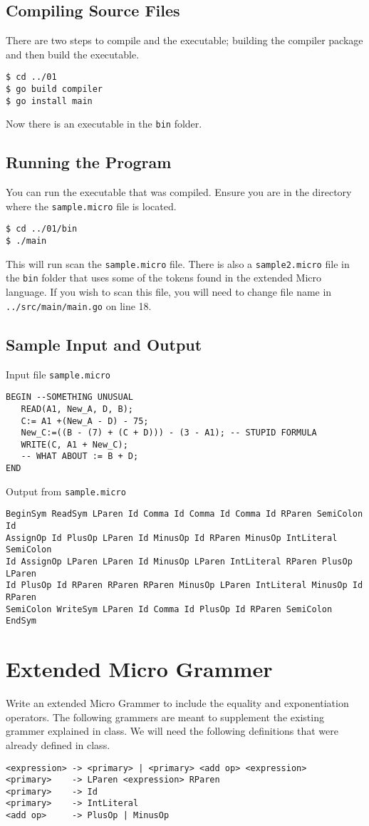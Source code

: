 \documentclass[11pt]{article}
\begin{document}
\subsection{Compiling Source Files}
\label{sec-1-3}
There are two steps to compile and the executable; building the compiler
package and then build the executable.
\begin{verbatim}
$ cd ../01
$ go build compiler
$ go install main
\end{verbatim}
Now there is an executable in the \texttt{bin} folder.

\subsection{Running the Program}
\label{sec-1-4}
You can run the executable that was compiled. Ensure you are in the 
directory where the \texttt{sample.micro} file is located.
\begin{verbatim}
$ cd ../01/bin
$ ./main
\end{verbatim}

This will run scan the \texttt{sample.micro} file. There is also a \texttt{sample2.micro}
file in the \texttt{bin} folder that uses some of the tokens found in the 
extended Micro language. If you wish to scan this file, you will need to
change file name in \texttt{../src/main/main.go} on line 18.

\subsection{Sample Input and Output}
\label{sec-1-5}
Input file \texttt{sample.micro}
\begin{verbatim}
BEGIN --SOMETHING UNUSUAL
   READ(A1, New_A, D, B);
   C:= A1 +(New_A - D) - 75;
   New_C:=((B - (7) + (C + D))) - (3 - A1); -- STUPID FORMULA
   WRITE(C, A1 + New_C);
   -- WHAT ABOUT := B + D;
END
\end{verbatim}
Output from \texttt{sample.micro}
\begin{verbatim}
BeginSym ReadSym LParen Id Comma Id Comma Id Comma Id RParen SemiColon Id 
AssignOp Id PlusOp LParen Id MinusOp Id RParen MinusOp IntLiteral SemiColon
Id AssignOp LParen LParen Id MinusOp LParen IntLiteral RParen PlusOp LParen
Id PlusOp Id RParen RParen RParen MinusOp LParen IntLiteral MinusOp Id RParen
SemiColon WriteSym LParen Id Comma Id PlusOp Id RParen SemiColon EndSym
\end{verbatim}


\section{Extended Micro Grammer}
\label{sec-2}
Write an extended Micro Grammer to include the equality and exponentiation
operators. The following grammers are meant to supplement the existing 
grammer explained in class.\newline
We will need the following definitions that were already defined in class.
\begin{verbatim}
<expression> -> <primary> | <primary> <add op> <expression>
<primary>    -> LParen <expression> RParen
<primary>    -> Id
<primary>    -> IntLiteral
<add op>     -> PlusOp | MinusOp
\end{verbatim}
\end{document}
